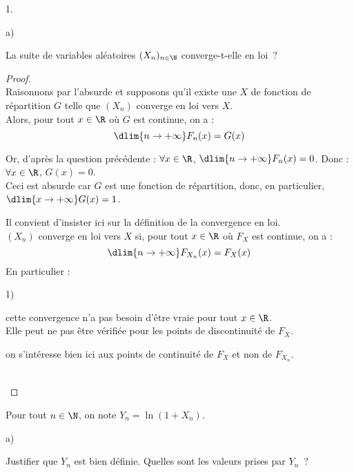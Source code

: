 \documentclass[11pt]{article}%
\begin{document}
\begin{noliste}{1.}
\begin{noliste}{a)}
\item La suite de variables aléatoires $(X_n)_{n \in \N}$ 
converge-t-elle en loi~?

\begin{proof}~\\
 Raisonnons par l'absurde et supposons qu'il existe une \var
  $X$ de fonction de répartition $G$ telle que $(X_n)$ converge en 
  loi vers $X$.\\
  Alors, pour tout $x\in\R$ où $G$ est continue, on a :
  \[
   \dlim{n\to+\infty} F_n(x) = G(x)
  \]
  
  
  
  \newpage
  
  
  
  Or, d'après la question précédente : 
  $\forall x\in\R$, $\dlim{n\to+\infty} F_n(x)=0$. Donc : 
  $\forall x\in\R$, $G(x)=0$.\\[.2cm]
  Ceci est absurde car $G$ est une fonction de répartition, donc, en 
  particulier, $\dlim{x\to+\infty} G(x)=1$.
  
  
  \begin{remarkL}{.8}
    Il convient d'insister ici sur la définition de la convergence en loi.\\
    $(X_n)$ converge en loi vers $X$ si, pour tout $x\in\R$ où $F_X$
    est continue, on a :
   \[
    \dlim{n\to+\infty} F_{X_n}(x) = F_X(x)
   \]
   En particulier :
   \begin{noliste}{1)}
   \item cette convergence n'a pas besoin d'être vraie pour tout
     $x\in\R$. \\
     Elle peut ne pas être vérifiée pour les points de discontinuité
     de $F_X$.
    \item on s'intéresse bien ici aux points de continuité de $F_X$ 
    et non de $F_{X_n}$.
   \end{noliste}
  \end{remarkL}~\\[-1.4cm]
\end{proof}

\end{noliste}

\item Pour tout $n \in \N$, on note $Y_n = \ln(1+X_n)$.
\begin{noliste}{a)}
\item Justifier que $Y_n$ est bien définie. Quelles sont les valeurs 
prises par $Y_n$~?


\end{noliste}
\end{noliste}
\end{document}
